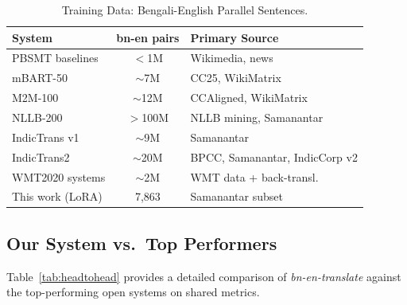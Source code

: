 \documentclass[conference]{IEEEtran}
\begin{document}
\begin{table}[t]
  \centering
  \caption{Training Data: Bengali-English Parallel Sentences.}
  \label{tab:data}
  \small
  \setlength{\tabcolsep}{3pt}
  \begin{tabular}{p{3.0cm} c p{3.0cm}}
    \toprule
    \textbf{System} & \textbf{bn-en pairs} & \textbf{Primary Source} \\
    \midrule
    PBSMT baselines  & $<$1M    & Wikimedia, news \\
    mBART-50         & $\sim$7M & CC25, WikiMatrix \\
    M2M-100          & $\sim$12M& CCAligned, WikiMatrix \\
    NLLB-200         & $>$100M  & NLLB mining, Samanantar \\
    IndicTrans v1    & $\sim$9M & Samanantar \\
    IndicTrans2      & $\sim$20M& BPCC, Samanantar, IndicCorp v2 \\
    WMT2020 systems  & $\sim$2M & WMT data + back-transl. \\
    This work (LoRA) & 7,863    & Samanantar subset \\
    \bottomrule
  \end{tabular}
\end{table}

\subsection{Our System vs.\ Top Performers}

Table~\ref{tab:headtohead} provides a detailed comparison of
\textit{bn-en-translate} against the top-performing open systems on
shared metrics.
\end{document}
